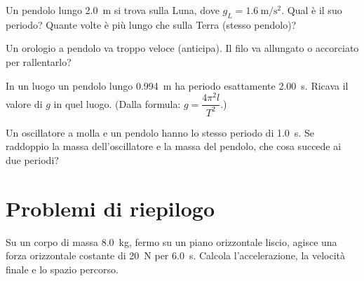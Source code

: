 \begin{esercizio}
Un pendolo lungo \SI{2,0}{\metre} si trova sulla Luna, dove $g_L = \SI{1,6}{\metre\per\second\squared}$. Qual è il suo periodo? Quante volte è più lungo che sulla Terra (stesso pendolo)?\\
\end{esercizio}

\begin{esercizio}
Un orologio a pendolo va troppo veloce (anticipa). Il filo va allungato o accorciato per rallentarlo?\\
\end{esercizio}

\begin{esercizio}
In un luogo un pendolo lungo \SI{0,994}{\metre} ha periodo esattamente \SI{2,00}{\second}. Ricava il valore di $g$ in quel luogo. (Dalla formula: $g = \dfrac{4\pi^2 l}{T^2}$.)\\
\end{esercizio}

\begin{esercizio}
Un oscillatore a molla e un pendolo hanno lo stesso periodo di \SI{1,0}{\second}. Se raddoppio la massa dell'oscillatore e la massa del pendolo, che cosa succede ai due periodi?\\
\end{esercizio}

\section{Problemi di riepilogo}

\begin{esercizio}
Su un corpo di massa \SI{8,0}{\kilo\gram}, fermo su un piano orizzontale liscio, agisce una forza orizzontale costante di \SI{20}{\newton} per \SI{6,0}{\second}. Calcola l'accelerazione, la velocità finale e lo spazio percorso.\\
\end{esercizio}

